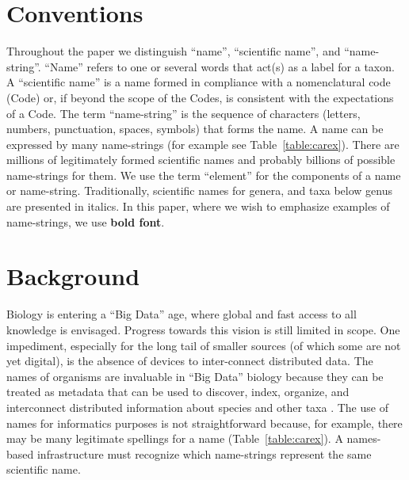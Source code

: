 \documentclass{bmcart}
\begin{document}


\section*{Conventions}

Throughout the paper we distinguish ``name'', ``scientific name'', and
``name-string''.  ``Name'' refers to one or several words that act(s) as a
label for a taxon. A ``scientific name'' is a name formed in compliance with a
nomenclatural code (Code) or, if beyond the scope of the Codes, is consistent
with the expectations of a Code.  The term ``name-string'' is the sequence of
characters (letters, numbers, punctuation, spaces, symbols) that forms the
name.  A name can be expressed by many name-strings (for example see
Table~\ref{table:carex}).  There are millions of legitimately formed scientific
names and probably billions of possible name-strings for them. We use the term
``element'' for the components of a name or name-string. Traditionally,
scientific names for genera, and taxa below genus are presented in italics. In
this paper, where we wish to emphasize examples of name-strings, we use
\textbf{bold font}.

\section*{Background}

Biology is entering a ``Big Data'' age, where global and fast access to all
knowledge is envisaged. Progress towards this vision is still limited in
scope. One impediment, especially for the long tail of smaller sources (of
which some are not yet digital), is the absence of devices to inter-connect
distributed data.  The names of organisms are invaluable in ``Big Data''
biology because they can be treated as metadata that can be used to discover,
index, organize, and interconnect distributed information about species and
other taxa \cite{Patterson2010}.  The use of names for informatics purposes is
not straightforward because, for example, there may be many legitimate
spellings for a name (Table~\ref{table:carex}). A names-based infrastructure
must recognize which name-strings represent the same scientific name.
\end{document}
